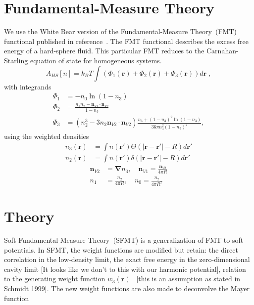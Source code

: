 \documentclass[letterpaper,twocolumn,amsmath,amssymb,prb]{revtex4-1}
\newcommand{\red}[1]{{\color{red} #1}}
\newcommand{\rr}{\textbf{r}}
\newcommand{\fixme}[1]{\red{[#1]}}
\begin{document}
\section{Fundamental-Measure Theory}

We use the White Bear version of the Fundamental-Measure Theory~(FMT)
functional published in reference~\cite{roth2002whitebear}.  The FMT
functional describes the excess free energy of a hard-sphere fluid.
This particular FMT reduces to the Carnahan-Starling equation of state
for homogeneous systems.
\begin{equation}
A_\textit{HS}[n] = k_B T \int \left(\Phi_1(\rr) + \Phi_2(\rr) + \Phi_3(\rr)\right) d\rr \; ,
\end{equation}
with integrands
\begin{align}
\Phi_1 &= -n_0 \ln\left( 1 - n_3\right)\\
\Phi_2 &= \frac{n_1 n_2 - \mathbf{n}_{V1} \cdot\mathbf{n}_{V2}}{1-n_3} \\
\Phi_3 &= (n_2^3 - 3 n_2 \mathbf{n}_{V2} \cdot \mathbf{n}_{V2}) \frac{
  n_3 + (1-n_3)^2 \ln(1-n_3)
}{
  36\pi n_3^2\left( 1 - n_3 \right)^2
} ,
\end{align}
using the weighted densities
\begin{align}
  n_3(\rr) &= \int n(\rr') \Theta(\left|\rr - \rr'\right| - R) d\rr' \\
  n_2(\rr) &= \int n(\rr') \delta(\left|\rr - \rr'\right| - R) d\rr'
\end{align}
\begin{align}
  \mathbf{n}_{V2} &= \mathbf{\nabla} n_3 , \quad
  \mathbf{n}_{V1} = \frac{\mathbf{n}_{V2}}{4\pi R} \\
  n_1 &= \frac{n_2}{4\pi R} , \quad
  n_0 = \frac{n_2}{4\pi R^2}
\end{align}

\section{Theory}

Soft Fundamental-Measure Theory~(SFMT) is a generalization of FMT to
soft potentials. In SFMT, the weight functions are modified but retain:
the direct correlation in the low-density limit, the exact free energy
in the zero-dimensional cavity limit \fixme{It looks like we don't to
  this with our harmonic potential}, relation to the generating
weight function $w_3(\rr)$~\cite{schmidt1999density} \fixme{this is an assumption
  as stated in Schmidt 1999}.  The new weight functions are also made
to deconvolve the Mayer function   
\end{document}
